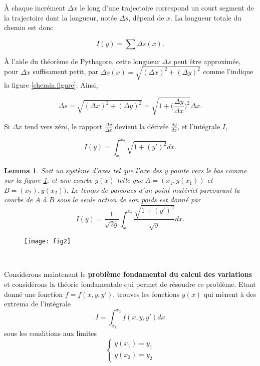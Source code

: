 \documentclass[10pt,a4paper]{article}%
\theoremstyle{theorem}
\newtheorem{lemma}{Lemma}
\theoremstyle{definition}
\begin{document}
	
	À chaque incrément $\Delta x$ le long d'une trajectoire correspond un court segment de la trajectoire dont la longueur, notée $\Delta s$, dépend de $x$. La longueur totale du chemin est donc
	
	\[I(y)=\sum \Delta s(x).\]
	
	À l'aide du théorème de Pythagore, cette longueur $\Delta s$ peut être approximée, pour $\Delta x$ suffisament petit, par $\Delta s(x)=\sqrt{(\Delta x)^2+(\Delta y)^2}$ comme l'indique la figure \ref{chemin.figure}. Ainsi, 
	
	\[\Delta s=\sqrt{(\Delta x)^2+(\Delta y)^2}=\sqrt{1+\big(\frac{\Delta y}{\Delta x}\big)^2}\Delta x.\]
	
	Si $\Delta x$ tend vers zéro, le rapport $\frac{\Delta y}{\Delta x}$ devient la dérivée $\frac{dy}{dx}$, et l'intégrale $I$,
	
	\begin{equation}\label{eq1}
		I(y)=\int_{x_1}^{x_2}\sqrt{1+(y')^2}dx.
	\end{equation}
	
	
	\begin{lemma}
		Soit un système d'axes tel que l'axe des y pointe vers le bas comme sur la figure \ref{lemma.figure}, et une courbe $y(x)$ telle que $A=(x_1,y(x_1))$ et $B=(x_2),y(x_2))$. Le temps de parcoues d'un point matériel parcourant la courbe de $A$ à $B$ sous la seule action de son poids est donné par 
		\begin{equation}\label{eq2}
			I(y)=\frac{1}{\sqrt{2g}}\int_{x_1}^{x_2}\frac{\sqrt{1+(y')^2}}{\sqrt{y}}dx.
		\end{equation}
	\end{lemma}
	
	\begin{figure}[h]
		\begin{center}
			\texttt{[image: fig2]}
		\end{center}
	\caption{~}\label{lemma.figure}
	\end{figure}


	Considerons maintenant le \textbf{problème fondamental du calcul des variations} et considérons la théorie fondamentale qui permet de résoudre  ce problème.
	Etant donné une fonction $f=f(x,y,y')$, trouves les fonctions $y(x)$ qui mènent à des extrema de l'intégrale \[I=\int_{x_1}^{x_2} f(x,y,y')dx\] sous les conditions aux limites 
	\begin{equation*}
		\begin{cases}
			y(x_1)=y_1
		 	\\
			y(x_2)=y_2
		\end{cases}
	\end{equation*}
		 
\end{document}
